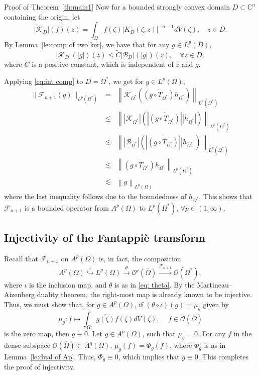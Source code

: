 \documentclass[11pt, oneside, reqno]{amsart}
\numberwithin{equation}{section}
\theoremstyle{definition}
\newcommand{\beas}{\begin{eqnarray*}}
\newcommand{\eeas}{\end{eqnarray*}}
\newcommand{\bes} {\begin{equation*}}
\newcommand{\ees} {\end{equation*}}
\newcommand{\be} {\begin{equation}}
\newcommand{\ee} {\end{equation}}
\newcommand{\hol}{\mathcal {O}}
\newcommand{\Cn}{{\mathbb{C}^n}}
\newcommand{\ltt}{\left(}
\newcommand{\rtt}{\right)}
\newcommand{\Om}{\Omega}
\begin{document}
{\begin{section}{Proof of Theorem~\ref{th:main1}}
Now for a bounded strongly convex domain $D\subset\Cn$ containing the origin, let 
\bes 
|\mathcal K_D|(f)(z)=\int_{\Om} f(\zeta) |K_D\ltt\zeta,z\rtt|^{-n-1} dV(\zeta),\quad z\in D.
\ees
By Lemma~\ref{le:comp of two ker}, we have that for any $g\in L^p\ltt D\rtt$,
\be\label{eq:int comp}
\left|\mathcal{K}_{D}\right|\ltt\left|g\right|\rtt(z)\leq \tilde{C}\left|\mathcal{B}_{D}\right|\ltt\left|g\right|\rtt(z), \quad \forall z\in D,
\ee
where $\tilde{C}$ is a positive constant, which is independent of $z$ and $g$. 

Applying \eqref{eq:int comp} to $D=\Om^*$, we get for $g\in L^p\ltt\Om\rtt$,
   \beas
   \|\mathcal F_{n+1}(g)\|_{L^p(\Om^*)}&=&\left\|\mathcal K_{\Om^*}\ltt\overline{\ltt g\circ T_{\Om^*}\rtt} h_{\Om^*}\rtt\right\|_{L^p(\Om^*)}\\
   &\leq& \left\|\left|\mathcal K_{\Om^*}\right|\ltt\left|\overline{\ltt g\circ T_{\Om^*}\rtt}\right|\left|h_{\Om^*}\right|\rtt\right\|_{L^p(\Om^*)}\\
   &\lesssim& \left\|\left|\mathcal B_{\Om^*}\right|\ltt\left|\overline{\ltt g\circ T_{\Om^*}\rtt}\right|\left|h_{\Om^*}\right|\rtt\right\|_{L^p(\Om^*)}\\
   &\lesssim&\left\| \overline{\ltt g\circ T_{\Om^*}\rtt}h_{\Om^*}\right\|_{L^p\ltt\Om^*\rtt}\\
   &\lesssim& \left\| g\right\|_{L^p\ltt\Om\rtt}
   \eeas
   where the last inequality follows due to the boundedness of $h_{\Om^*}$. This shows that $\mathcal F_{n+1}$ is a bounded operator from $A^p\ltt\Om\rtt$ to $L^p\ltt\Om^*\rtt$, $\forall p\in(1,\infty)$.
\end{section}
\subsection{Injectivity of the Fantappi{\`e} transform} Recall that $\mathcal F_{n+1}$ on $A^p(\Om)$ is, in fact, the composition
\bes
A^p(\Om)\overset{\iota} {\hookrightarrow}L^p(\Om)\xrightarrow\theta\hol'(\overline{\Om})\xrightarrow{\mathcal F_{n+1}} \hol(\Om^*),
\ees
where $\iota$ is the inclusion map, and $\theta$ is as in \eqref{eq: theta}. By the Martineau--Aizenberg duality theorem, the right-most map is already known to be injective. Thus, we must show that, for $g\in A^p(\Om)$, if  $(\theta\circ\iota)(g)=\mu_g$ given by
\bes
\mu_g:f\mapsto \int_{\Om}\overline {g(\zeta)} f(\zeta)dV(\zeta),\,\quad f\in \hol\ltt\overline\Om\rtt
\ees
is the zero map, then $g\equiv 0$. Let $g\in A^p\ltt\Om\rtt$, such that $\mu_{g}=0$. 
For any $f$ in the dense subspace $\hol\ltt\overline\Om\rtt \subset A^q\ltt\Om\rtt$, $\mu_g(f)=\overline{\Phi_g(f)}$, where $\Phi_g$ is as in Lemma~\ref{le:dual of Ap}. Thus, $\Phi_g\equiv 0$, which implies that $g\equiv 0$. This completes the proof of injectivity.
   
}
\end{document}
